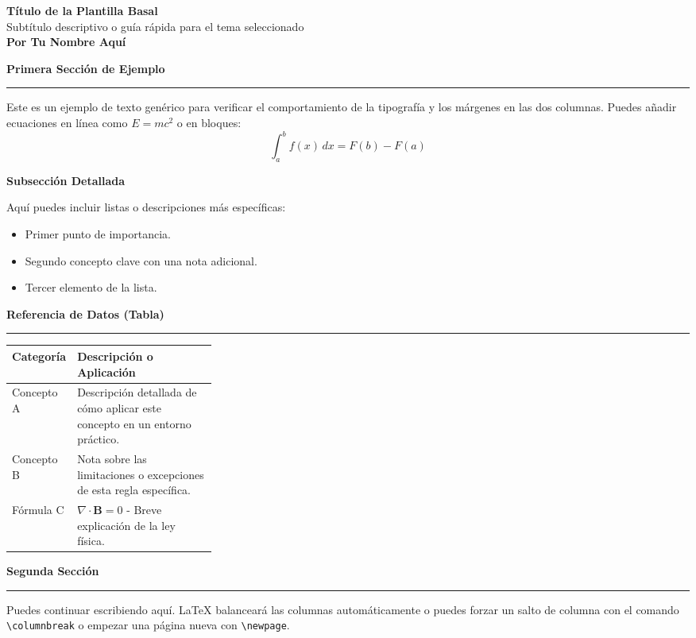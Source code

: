 \documentclass[10pt, landscape, twocolumn]{article}
\newcommand{\cheatsheetsection}[1]{
    \vspace{0.6em}
    {\color{themeblue}\large\bfseries #1} \par
    \vspace{-0.5em}
    {\color{themeblue}\rule{\linewidth}{1pt}} \par
    \vspace{0.2em}
}
\newcommand{\cheatsheetsubsection}[1]{
    \vspace{0.4em}
    {\color{themeblue}\normalsize\bfseries #1} \par
    \vspace{0.1em}
}
\begin{document}
\begin{center}
    \vspace{-1em}
    {\color{themeblue}\huge\bfseries Título de la Plantilla Basal}\\[0.1em]
    {\color{themegray}\small Subtítulo descriptivo o guía rápida para el tema seleccionado}\\[0.4em]
    {\color{themegray}\footnotesize \textbf{Por Tu Nombre Aquí}}
\end{center}
\vspace{-1em}

\cheatsheetsection{Primera Sección de Ejemplo}
Este es un ejemplo de texto genérico para verificar el comportamiento de la tipografía y los márgenes en las dos columnas. Puedes añadir ecuaciones en línea como $E = mc^2$ o en bloques:
\[ \int_{a}^{b} f(x) \, dx = F(b) - F(a) \]

\cheatsheetsubsection{Subsección Detallada}
Aquí puedes incluir listas o descripciones más específicas:
\begin{itemize}[leftmargin=*, nosep]
    \item Primer punto de importancia.
    \item Segundo concepto clave con una nota adicional.
    \item Tercer elemento de la lista.
\end{itemize}

\cheatsheetsection{Referencia de Datos (Tabla)}
\vspace{0.2em}
\renewcommand{\arraystretch}{1.2}
\begin{tabularx}{\linewidth}{|p{0.3\linewidth}|X|}
\hline
\textbf{Categoría} & \textbf{Descripción o Aplicación} \\ \hline
Concepto A & Descripción detallada de cómo aplicar este concepto en un entorno práctico. \\ \hline
Concepto B & Nota sobre las limitaciones o excepciones de esta regla específica. \\ \hline
Fórmula C & $\nabla \cdot \mathbf{B} = 0$ - Breve explicación de la ley física. \\ \hline
\end{tabularx}

\vspace{1em}
\cheatsheetsection{Segunda Sección}
Puedes continuar escribiendo aquí. LaTeX balanceará las columnas automáticamente o puedes forzar un salto de columna con el comando \texttt{\textbackslash columnbreak} o empezar una página nueva con \texttt{\textbackslash newpage}.

\end{document}
